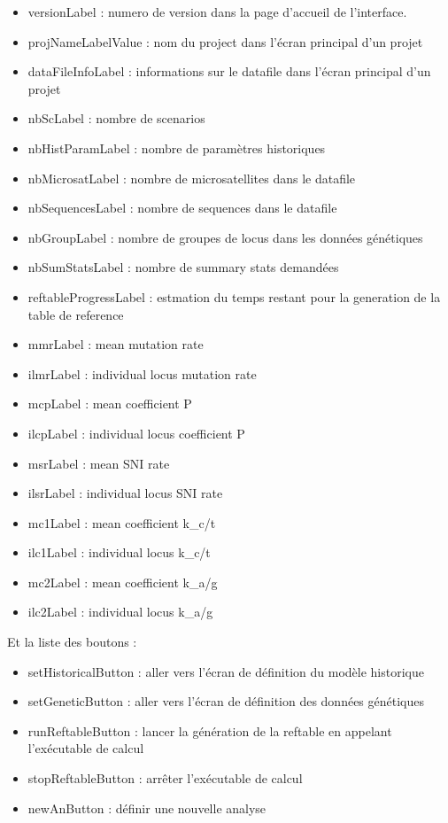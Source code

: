 \documentclass[12pt,a4paper]{article}
\begin{document}
    \begin{itemize} 
        \item versionLabel : numero de version dans la page d'accueil de
            l'interface.
        \item projNameLabelValue : nom du project dans l'écran principal d'un projet
        \item dataFileInfoLabel : informations sur le datafile dans l'écran
            principal d'un projet
        \item nbScLabel : nombre de scenarios
        \item nbHistParamLabel : nombre de paramètres historiques
        \item nbMicrosatLabel : nombre de microsatellites dans le datafile
        \item nbSequencesLabel : nombre de sequences dans le datafile
        \item nbGroupLabel : nombre de groupes de locus dans les données
            génétiques
        \item nbSumStatsLabel : nombre de summary stats demandées
        \item reftableProgressLabel : estmation du temps restant pour la
            generation de la table de reference
        \item mmrLabel : mean mutation rate
        \item ilmrLabel : individual locus mutation rate
        \item mcpLabel : mean coefficient P
        \item ilcpLabel : individual locus coefficient P
        \item msrLabel : mean SNI rate
        \item ilsrLabel : individual locus SNI rate
        \item mc1Label : mean coefficient k\_c/t
        \item ilc1Label : individual locus k\_c/t
        \item mc2Label : mean coefficient k\_a/g
        \item ilc2Label : individual locus k\_a/g \\
    \end{itemize}

    Et la liste des boutons :\\

    \begin{itemize} 
        \item setHistoricalButton : aller vers l'écran de définition du modèle
            historique
        \item setGeneticButton : aller vers l'écran de définition des données
            génétiques
        \item runReftableButton : lancer la génération de la reftable en
            appelant l'exécutable de calcul
        \item stopReftableButton : arrêter l'exécutable de calcul
        \item newAnButton : définir une nouvelle analyse
    \end{itemize}
\end{document}
